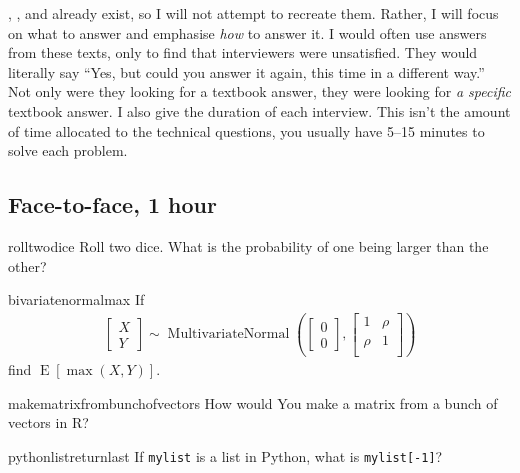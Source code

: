\documentclass[a4paper]{article}
\begin{document}
\citet{HeardOnTheStreet},
\citet{JoshiQA}, and
\citet{WilmottFAQ} already exist, so I will not attempt to recreate them.
Rather, I will focus on what to answer and emphasise \emph{how} to answer it.
I would often use answers from these texts, only to find that interviewers were unsatisfied.
They would literally say ``Yes, but could you answer it again, this time in a different way.''
Not only were they looking for a textbook answer, they were looking for \emph{a specific} textbook answer.
I also give the duration of each interview.
This isn't the amount of time allocated to the technical questions, you usually have 5--15 minutes to solve each problem.

\subsection{Face-to-face, 1 hour}

\begin{question}{rolltwodice}
Roll two dice. What is the probability of one being larger than the other?
\end{question}

\begin{question}{bivariatenormalmax}
If
\begin{align*}
  \begin{bmatrix}
  X \\ Y
  \end{bmatrix}
  \sim
  \operatorname{MultivariateNormal}
  \left(
  \begin{bmatrix}
  0 \\ 0
  \end{bmatrix}
  ,
  \begin{bmatrix}
  1      &   \rho \\
  \rho   &   1    \\
  \end{bmatrix}
  \right)
\end{align*}
find $\operatorname{E}[\max(X,Y)]$.
\end{question}

\begin{question}{makematrixfrombunchofvectors}
How would You make a matrix from a bunch of vectors in R?
\end{question}

\begin{question}{pythonlistreturnlast}
If \verb+mylist+ is a list in Python, what is \verb+mylist[-1]+?
\end{question}
\end{document}
